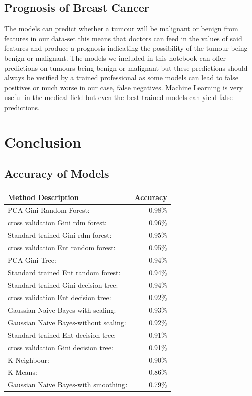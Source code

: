 \documentclass[conference]{IEEEtran}
\begin{document}
\subsection{Prognosis of Breast Cancer}
The models can predict whether a tumour will be malignant or benign from features in our data-set this means that doctors can feed in the values of said features and produce a prognosis indicating the possibility of the tumour being benign or malignant.  The models we included in this notebook can offer predictions on tumours being benign or malignant but these predictions should always be verified by a trained professional as some models can lead to false positives or much worse in our case, false negatives.  Machine Learning is very useful in the medical field but even the best trained models can yield false predictions.
\section{Conclusion}
\subsection{Accuracy of Models}
\begin{adjustbox}{max width=\textwidth}
\begin{tabular}{lr}

\hline
 Method Description                     &Accuracy\\
\hline
 PCA Gini Random Forest:                &0.98\%\\
 cross validation Gini rdm forest:   &0.96\%\\
 Standard trained Gini rdm forest:   &0.95\%\\
 cross validation Ent random forest:&0.95\%\\
 PCA Gini Tree:                         &0.94\%\\
 Standard trained Ent random forest:&0.94\%\\
 Standard trained Gini decision tree:   &0.94\%\\
 cross validation Ent decision tree:&0.92\%\\
 Gaussian Naive Bayes-with scaling:   &0.93\%\\
 Gaussian Naive Bayes-without scaling:&0.92\%\\
 Standard trained Ent decision tree:&0.91\%\\
 cross validation Gini decision tree:   &0.91\%\\
 K Neighbour:                           &0.90\%\\
 K Means:                               &0.86\%\\
 Gaussian Naive Bayes-with smoothing: &0.79\%\\

\hline
\end{tabular}
\end{adjustbox}
\\
\\
\end{document}
